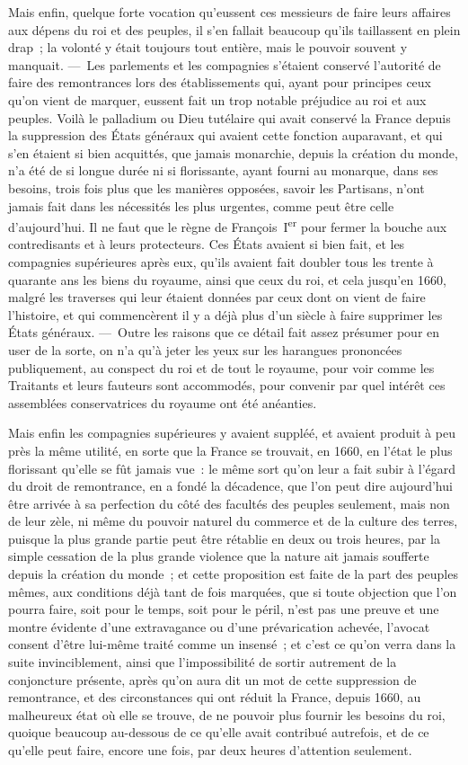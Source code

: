 \documentclass[french,twoside]{book} %
\begin{document}
Mais enfin, quelque forte vocation qu’eussent ces messieurs de faire leurs affaires aux dépens du roi et des peuples, il s’en fallait beaucoup qu’ils taillassent en plein drap ; la volonté y était toujours tout entière, mais le pouvoir souvent y manquait. — Les parlements et les compagnies s’étaient conservé l’autorité de faire des remontrances lors des établissements qui, ayant pour principes ceux qu’on vient de marquer, eussent fait un trop notable préjudice au roi et aux peuples. Voilà le palladium ou Dieu tutélaire qui avait conservé la France depuis la suppression des États généraux qui avaient cette fonction auparavant, et qui s’en étaient si bien acquittés, que jamais monarchie, depuis la création du monde, n’a été de si longue durée ni si florissante, ayant fourni au monarque, dans ses besoins, trois fois plus que les manières opposées, savoir les Partisans, n’ont jamais fait dans les nécessités les plus urgentes, comme peut être celle d’aujourd’hui. Il ne faut que le règne de François I\textsuperscript{er} pour fermer la bouche aux contredisants et à leurs protecteurs. Ces États avaient si bien fait, et les compagnies supérieures après eux, qu’ils avaient fait doubler tous les trente à quarante ans les biens du royaume, ainsi que ceux du roi, et cela jusqu’en 1660, malgré les traverses qui leur étaient données par ceux dont on vient de faire l’histoire, et qui commencèrent il y a déjà plus d’un siècle à faire supprimer les États généraux. — Outre les raisons que ce détail fait assez présumer pour en user de la sorte, on n’a qu’à jeter les yeux sur les harangues prononcées publiquement, au conspect du roi et de tout le royaume, pour voir comme les Traitants et leurs fauteurs sont accommodés, pour convenir par quel intérêt ces assemblées conservatrices du royaume ont été anéanties.\par
Mais enfin les compagnies supérieures y avaient suppléé, et avaient produit à peu près la même utilité, en sorte que la France se trouvait, en 1660, en l’état le plus florissant qu’elle se fût jamais vue : le même sort qu’on leur a fait subir à l’égard du droit de remontrance, en a fondé la décadence, que l’on peut dire aujourd’hui être arrivée à sa perfection du côté des facultés des peuples seulement, mais non de leur zèle, ni même du pouvoir naturel du commerce et de la culture des terres, puisque la plus grande partie peut être rétablie en deux ou trois heures, par la simple cessation de la plus grande violence que la nature ait jamais soufferte depuis la création du monde ; et cette proposition est faite de la part des peuples mêmes, aux conditions déjà tant de fois marquées, que si toute objection que l’on pourra faire, soit pour le temps, soit pour le péril, n’est pas une preuve et une montre évidente d’une extravagance ou d’une prévarication achevée, l’avocat consent d’être lui-même traité comme un insensé ; et c’est ce qu’on verra dans la suite invinciblement, ainsi que l’impossibilité de sortir autrement de la conjoncture présente, après qu’on aura dit un mot de cette suppression de remontrance, et des circonstances qui ont réduit la France, depuis 1660, au malheureux état où elle se trouve, de ne pouvoir plus fournir les besoins du roi, quoique beaucoup au-dessous de ce qu’elle avait contribué autrefois, et de ce qu’elle peut faire, encore une fois, par deux heures d’attention seulement.
\end{document}

